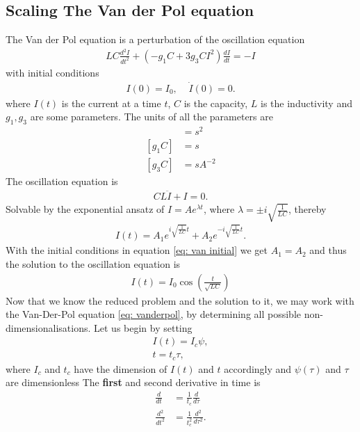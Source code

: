 \subsection{Scaling The Van der Pol equation}
The Van der Pol equation is a perturbation of the oscillation equation
\begin{align}\label{eq: vanderpol}
    LC\frac{d^2I}{dt^2} + (-g_1C +3g_3CI^2)\frac{dI}{dt} = -I
\end{align}
with initial conditions
\begin{align}\label{eq: van initial}
    I(0) = I_0,\;\;\;\; \dot{I}(0) = 0.
\end{align}
where $I(t)$ is the current at a time $t$, $C$ is the capacity, $L$ is the
inductivity and $g_1, g_3$ are some parameters. The units of all the
parameters are
\begin{align}
    [LC] &= s^2\\
    [g_1C] &= s\\
    [g_3C] &= sA^{-2}
\end{align}
The oscillation equation is
\begin{align}
    CL\ddot{I} + I = 0.
\end{align}
Solvable by the exponential ansatz of $I = Ae^{\lambda t}$, where $\lambda=
\pm i \sqrt{\frac{1}{LC}}$, thereby
\begin{align}
    I(t) = A_1 e^{i\sqrt{\frac{1}{LC}}t} + A_2 e^{-i\sqrt{\frac{1}{LC}}t}.
\end{align}
With the initial conditions in equation \ref{eq: van initial} we get $A_1 =
A_2$ and thus the solution to the oscillation equation is
\begin{align}
    I(t) = I_0\cos(\frac{t}{\sqrt{LC}})
\end{align}
Now that we know the reduced problem and the solution to it, we may work with
the Van-Der-Pol equation \ref{eq: vanderpol}, by determining all possible
non-dimensionalisations. Let us begin by setting
\begin{align}
    I(t) = I_c\psi,\\
    t = t_c \tau,
\end{align}
where $I_c$ and $t_c$ have the dimension of $I(t)$ and $t$ accordingly and
$\psi(\tau)$ and $\tau$ are dimensionless
The \textbf{first} and second derivative in time is
\begin{align}
    \frac{d}{dt} &= \frac{1}{t_c}\frac{d}{d\tau}\\
    \frac{d^2}{dt^2} &= \frac{1}{t_c^2}\frac{d^2}{d\tau^2}.
\end{align}
